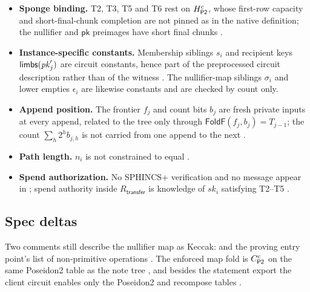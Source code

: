 \begin{itemize}
\item \textbf{Sponge binding.} T2, T3, T5 and T6 rest on $H_{\mathsf{P2}}^{\mathrm{c}}$,
  whose first-row capacity and short-final-chunk completion are not pinned as
  in the native definition; the nullifier and $\mathsf{pk}$ preimages have short
  final chunks .
\item \textbf{Instance-specific constants.} Membership siblings $s_i$ and
  recipient keys $\mathsf{limbs}(\mathit{pk}'_j)$ are circuit constants, hence part of
  the preprocessed circuit description rather than of the witness
  . The nullifier-map siblings $\sigma_i$ and lower empties
  $\epsilon_i$ are likewise constants and are checked by count only.
\item \textbf{Append position.} The frontier $f_j$ and count bits $b_j$ are fresh
  private inputs at every append, related to the tree only through
  $\mathsf{FoldF}(f_j,b_j)=T_{j-1}$; the count $\sum_h 2^h b_{j,h}$ is not
  carried from one append to the next .
\item \textbf{Path length.} $n_i$ is not constrained to equal 
  .
\item \textbf{Spend authorization.} No SPHINCS+ verification and no
   message appear in ; spend
  authority inside $R_{\mathsf{transfer}}$ is knowledge of $\mathit{sk}_i$
  satisfying T2--T5 
   .
\end{itemize}

\subsection{Spec deltas}

\begin{specdelta}
Two comments still describe the nullifier map as Keccak:
 and the proving entry point's
list of non-primitive operations .
The enforced map fold is $C_{\mathsf{P2}}^{\mathrm{c}}$ on the same Poseidon2 table as the
note tree , and besides the
statement export the client circuit enables only the Poseidon2 and recompose
tables .
\end{specdelta}

